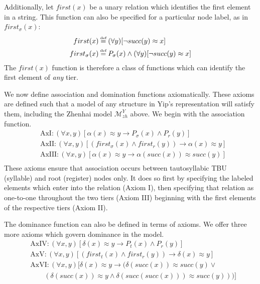 \documentclass{article}
\newcommand\myeq{\mathrel{\stackrel{\makebox[0pt]{\mbox{\normalfont\tiny def}}}{=}}}
\newcommand{\ap}{\approx}
\newcommand{\all}{\forall}
\begin{document}
Additionally, let $first(x)$ be a unary relation which identifies the first element in a string. This function can also be specified for a particular node label, as in $first_{\sigma}(x)$:
\begin{equation} \label{aux2}
\begin{aligned}
first(x) &\myeq (\forall y)[\neg succ(y)\ap x] \\
first_{\sigma}(x) &\myeq P_{\sigma}(x)\land (\forall y)[\neg succ(y)\ap x] \\
\end{aligned}
\end{equation}
The $first(x)$ function is therefore a class of functions which can identify the first element of \emph{any} tier. \par
We now define association and domination functions axiomatically. These axioms are defined such that a model of any structure in Yip's representation will satisfy them, including the Zhenhai model $\mathcal{M}^{Y}_{zh}$ above. We begin with the association function.
\begin{equation}
\begin{aligned}
&\text{AxI:}\,(\all x,y)[\alpha(x)\ap y \rightarrow P_{\sigma}(x)\land P_{r}(y)]\\
&\text{AxII:}\,(\all x,y)[(first_{\sigma}(x)\land first_{r}(y))\rightarrow\alpha(x)\ap y]\\
&\text{AxIII:}\,(\all x,y)[\alpha(x) \ap y \rightarrow \alpha(succ(x))\ap succ(y)] \\
\end{aligned}
\end{equation}
These axioms ensure that association occurs between tautosyllabic TBU (syllable) and root (register) nodes only. It does so first by specifying the labeled elements which enter into the relation (Axiom I), then specifying that relation as one-to-one throughout the two tiers (Axiom III) beginning with the first elements of the respective tiers (Axiom II).\par
The dominance function can also be defined in terms of axioms. We offer three more axioms which govern dominance in the model.
\begin{equation}
\begin{aligned} 
&\text{AxIV:}\,(\all x,y)[\delta(x)\ap y \rightarrow P_{t}(x)\land P_{r}(y)]\\
&\text{AxV:}\,(\all x,y)[(first_{t}(x)\land first_{r}(y))\rightarrow\delta(x)\ap y]\\
&\text{AxVI:}\,(\all x,y)[\delta(x) \ap y \rightarrow \big(\delta(succ(x))\ap succ(y)\lor\\
&\quad \quad (\delta(succ(x))\ap y \land \delta(succ(succ(x)))\ap succ(y))\big)] \\
\end{aligned}
\end{equation}
\end{document}
